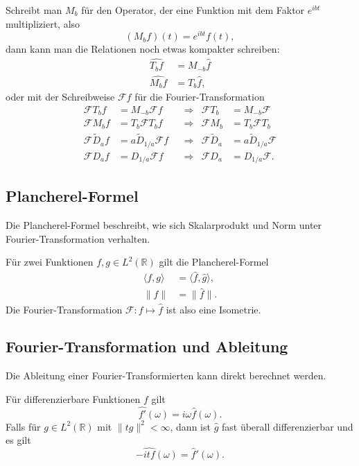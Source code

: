 Schreibt man $M_b$ für den Operator, der eine Funktion mit dem
Faktor $e^{ibt}$ multipliziert, also
\[
(M_bf)(t) = e^{ibt}f(t),
\]
dann kann man die Relationen noch etwas kompakter schreiben:
\begin{align*}
\widehat{T_bf}
&=
M_{-b}\hat{f}
\\
\widehat{M_bf}
&=
T_b\hat{f},
\end{align*}
oder mit der Schreibweise $\mathcal{F}f$ für die Fourier-Transformation
\[
\begin{aligned}
\mathcal{F}T_b f &= M_{-b}\mathcal F f
&&\Rightarrow &
\mathcal{F}T_b &= M_{-b}\mathcal{F}
\\
\mathcal{F}M_b f&=T_b\mathcal{F}T_bf
&&\Rightarrow &
\mathcal{F}M_b&=T_b\mathcal{F}T_b
\\
\mathcal{F}\tilde{D}_af&=a \tilde{D}_{1/a} \mathcal F f
&&\Rightarrow &
\mathcal{F}\tilde{D}_a&=a \tilde{D}_{1/a} \mathcal F 
\\
\mathcal{F}D_af&=D_{1/a} \mathcal F f
&&\Rightarrow &
\mathcal{F}D_a&= D_{1/a} \mathcal F.
\end{aligned}
\]

\subsection{Plancherel-Formel}
%
Die Plancherel-Formel beschreibt, wie sich Skalarprodukt und Norm
unter Fourier-Transformation verhalten.

\begin{satz}
Für zwei Funktionen $f,g\in L^2(\mathbb R)$ gilt die Plancherel-Formel
\begin{align*}
\langle f,g\rangle
&=
\langle \hat{f},\hat{g}\rangle,
\\
\|f\|&=\|\hat{f}\|.
\end{align*}
Die Fourier-Transformation $\mathcal{F}\colon f\mapsto \hat{f}$ ist
also eine Isometrie.
\end{satz}

\subsection{Fourier-Transformation und Ableitung
\label{subsection:ft-ableitung}}
Die Ableitung einer Fourier-Transformierten kann direkt berechnet werden.

\begin{satz}
\label{fourier:satz:ableitung}
Für differenzierbare Funktionen $f$ gilt
\[
\widehat{f'}(\omega) = i\omega \hat{f}(\omega).
\]
Falls für $g\in L^2(\mathbb R)$ mit $\|tg\|^2<\infty$, dann ist $\hat{g}$
fast überall differenzierbar und es gilt
\[
-\widehat{i t f}(\omega) = \hat{f}'(\omega).
\]
\end{satz}


